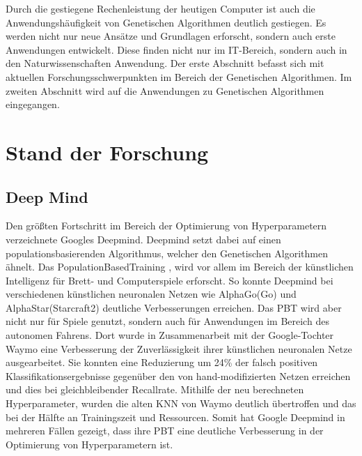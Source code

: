 Durch die gestiegene Rechenleistung der heutigen Computer ist auch die Anwendungshäufigkeit von Genetischen Algorithmen deutlich gestiegen. Es werden nicht nur neue Ansätze und Grundlagen erforscht, sondern auch erste Anwendungen entwickelt. Diese finden nicht nur im IT-Bereich, sondern auch in den Naturwissenschaften Anwendung. Der erste Abschnitt befasst sich mit aktuellen Forschungsschwerpunkten im Bereich der Genetischen Algorithmen. Im zweiten Abschnitt wird auf die Anwendungen zu Genetischen Algorithmen eingegangen.

\section{Stand der Forschung}

\subsection{Deep Mind}
Den größten Fortschritt im Bereich der Optimierung von Hyperparametern  verzeichnete Googles Deepmind. Deepmind setzt dabei auf einen populationsbasierenden Algorithmus, welcher den Genetischen Algorithmen ähnelt. Das PopulationBasedTraining \cite{pbt}, wird vor allem im Bereich der künstlichen Intelligenz für Brett- und Computerspiele erforscht. So konnte Deepmind bei verschiedenen künstlichen neuronalen Netzen wie AlphaGo(Go) \cite{alphago} und AlphaStar(Starcraft2) \cite{alphastar} deutliche Verbesserungen erreichen. Das PBT wird aber nicht nur für Spiele genutzt, sondern auch für Anwendungen im Bereich des autonomen Fahrens. Dort wurde in Zusammenarbeit mit der Google-Tochter Waymo eine Verbesserung der Zuverlässigkeit ihrer künstlichen neuronalen Netze ausgearbeitet. Sie konnten eine Reduzierung um 24\% der falsch positiven Klassifikationsergebnisse gegenüber den von hand-modifizierten Netzen erreichen und dies bei gleichbleibender Recallrate. Mithilfe der neu berechneten Hyperparameter, wurden die alten KNN von Waymo deutlich übertroffen und das bei der Hälfte an Trainingszeit und Ressourcen. Somit hat Google Deepmind in mehreren Fällen gezeigt, dass ihre PBT eine deutliche Verbesserung in der Optimierung von Hyperparametern ist. \cite{Waymo}


